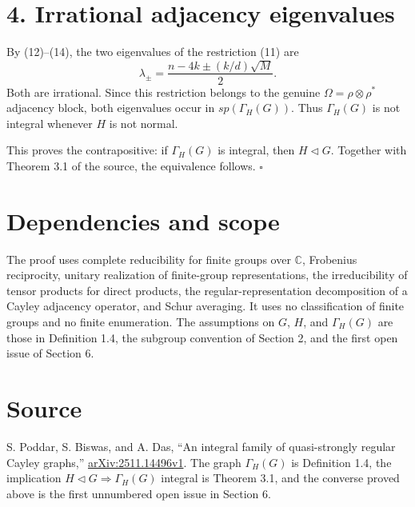 \documentclass[11pt]{article}
\begin{document}
\section*{4. Irrational adjacency eigenvalues}

By (12)--(14), the two eigenvalues of the restriction (11) are
\[
 \lambda_\pm
  =\frac{n-4k\pm (k/d)\sqrt M}{2}. \tag{20}
\]
Both are irrational. Since this restriction belongs to the genuine
\(\Omega=\rho\otimes\rho^*\) adjacency block, both eigenvalues occur in
\(sp(\Gamma_H(G))\). Thus \(\Gamma_H(G)\) is not integral whenever
\(H\) is not normal.

This proves the contrapositive: if \(\Gamma_H(G)\) is integral, then
\(H\lhd G\). Together with Theorem 3.1 of the source, the equivalence follows.
\(\square\)

\section*{Dependencies and scope}

The proof uses complete reducibility for finite groups over \(\mathbb C\),
Frobenius reciprocity, unitary realization of finite-group
representations, the irreducibility of tensor products for direct products,
the regular-representation decomposition of a Cayley adjacency operator,
and Schur averaging. It uses no classification of finite groups and no
finite enumeration. The assumptions on \(G\), \(H\), and \(\Gamma_H(G)\)
are those in Definition 1.4, the subgroup convention of Section 2, and the first open issue of Section 6.

\section*{Source}

S. Poddar, S. Biswas, and A. Das, ``An integral family of quasi-strongly
regular Cayley graphs,'' \href{https://arxiv.org/abs/2511.14496v1}{arXiv:2511.14496v1}.
The graph \(\Gamma_H(G)\) is Definition 1.4, the implication
\(H\lhd G\Rightarrow\Gamma_H(G)\) integral is Theorem 3.1, and the converse
proved above is the first unnumbered open issue in Section 6.
\end{document}
